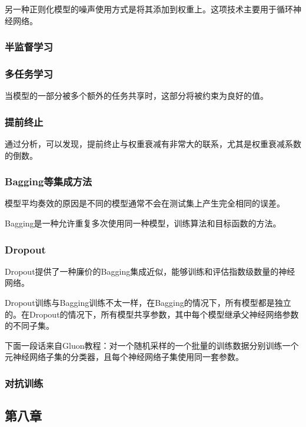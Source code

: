 另一种正则化模型的噪声使用方式是将其添加到权重上。这项技术主要用于循环神经网络。

\subsubsection{半监督学习}

\subsubsection{多任务学习}

当模型的一部分被多个额外的任务共享时，这部分将被约束为良好的值。

\subsubsection{提前终止}

通过分析，可以发现，提前终止与权重衰减有非常大的联系，尤其是权重衰减系数的倒数。

\subsubsection{Bagging等集成方法}

模型平均奏效的原因是不同的模型通常不会在测试集上产生完全相同的误差。

Bagging是一种允许重复多次使用同一种模型，训练算法和目标函数的方法。

\subsubsection{Dropout}

Dropout提供了一种廉价的Bagging集成近似，能够训练和评估指数级数量的神经网络。

Dropout训练与Bagging训练不太一样，在Bagging的情况下，所有模型都是独立的。在Dropout的情况下，所有模型共享参数，其中每个模型继承父神经网络参数的不同子集。

下面一段话来自Gluon教程：对一个随机采样的一个批量的训练数据分别训练一个元神经网络子集的分类器，且每个神经网络子集使用同一套参数。

\subsubsection{对抗训练}



\subsection{第八章}


